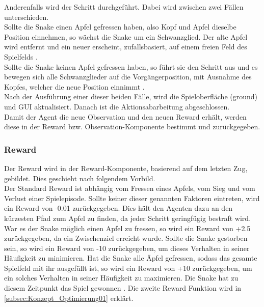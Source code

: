 Anderenfalls wird der Schritt durchgeführt. Dabei wird zwischen zwei Fällen unterschieden.\\
Sollte die Snake einen Apfel gefressen haben, also Kopf und Apfel dieselbe Position einnehmen, so wächst die Snake um ein Schwanzglied. Der alte Apfel wird entfernt und ein neuer erscheint, zufallsbasiert, auf einem freien Feld des Spielfelds .\\
Sollte die Snake keinen Apfel gefressen haben, so führt sie den Schritt aus und es bewegen sich alle Schwanzglieder auf die Vorgängerposition, mit Ausnahme des Kopfes, welcher die neue Position einnimmt .\\
Nach der Ausführung einer dieser beiden Fälle, wird die Spieloberfläche (ground) und GUI aktualisiert. Danach ist die Aktionsabarbeitung abgeschlossen.\\
Damit der Agent die neue Observation und den neuen Reward erhält, werden diese in der Reward bzw. Observation-Komponente bestimmt und zurückgegeben.

\subsubsection{Reward} \label{subsubsec:Konzept_Reward}
Der Reward wird in der Reward-Komponente, basierend auf dem letzten Zug, gebildet. Dies geschieht nach folgendem Vorbild.\\
Der Standard Reward ist abhängig vom Fressen eines Apfels, vom Sieg und vom Verlust einer Spielepisode. Sollte keiner dieser genannten Faktoren eintreten, wird ein Reward von -0.01 zurückgegeben. Dies hält den Agenten dazu an den kürzesten Pfad zum Apfel zu finden, da jeder Schritt geringfügig bestraft wird.
War es der Snake möglich einen Apfel zu fressen, so wird ein Reward von +2.5 zurückgegeben, da ein Zwischenziel erreicht wurde.
Sollte die Snake gestorben sein, so wird ein Reward von -10 zurückgegeben, um dieses Verhalten in seiner Häufigkeit zu minimieren.
Hat die Snake alle Äpfel gefressen, sodass das gesamte Spielfeld mit ihr ausgefüllt ist, so wird ein Reward von +10 zurückgegeben, um ein solches Verhalten in seiner Häufigkeit zu maximieren.
Die Snake hat zu diesem Zeitpunkt das Spiel gewonnen .
Die zweite Reward Funktion wird in \autoref{subsec:Konzept_Optimierung01} erklärt.

